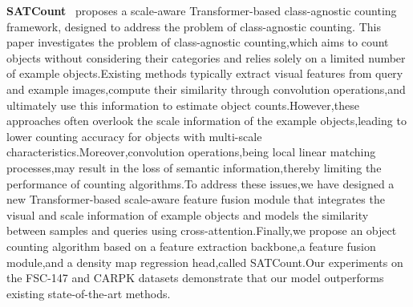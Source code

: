 \documentclass[lettersize,journal]{IEEEtran}
\begin{document}
\textbf{SATCount}~\cite{Wang2024-lz} proposes a scale-aware Transformer-based class-agnostic counting framework, designed to address the problem of class-agnostic counting. This paper investigates the problem of class-agnostic counting,which aims to count objects without considering their categories and relies solely on a limited number of example objects.Existing methods typically extract visual features from query and example images,compute their similarity through convolution operations,and ultimately use this information to estimate object counts.However,these approaches often overlook the scale information of the example objects,leading to lower counting accuracy for objects with multi-scale characteristics.Moreover,convolution operations,being local linear matching processes,may result in the loss of semantic information,thereby limiting the performance of counting algorithms.To address these issues,we have designed a new Transformer-based scale-aware feature fusion module that integrates the visual and scale information of example objects and models the similarity between samples and queries using cross-attention.Finally,we propose an object counting algorithm based on a feature extraction backbone,a feature fusion module,and a density map regression head,called SATCount.Our experiments on the FSC-147 and CARPK datasets demonstrate that our model outperforms existing state-of-the-art methods.







 
\end{document}

